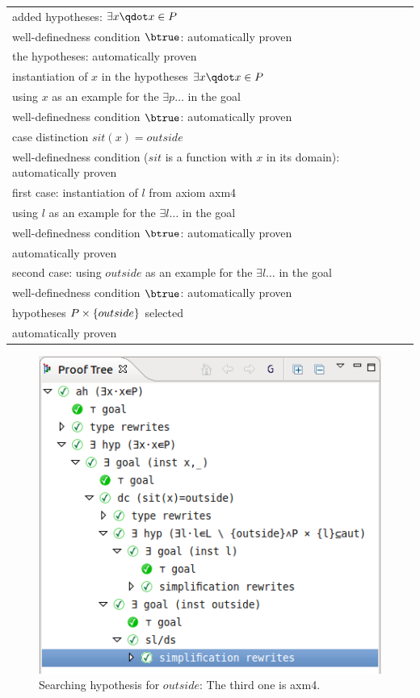 \begin{tabular}{l}
  \hline
  added hypotheses: $\exists x\qdot x\in P$ \\
  \quad well-definedness condition $\btrue$: automatically proven\\
  \quad the hypotheses: automatically proven \\
  \quad instantiation of $x$ in the hypotheses $\exists x\qdot x\in P$\\
  \qquad using $x$ as an example for the $\exists p \ldots$ in the goal\\
  \quad\qquad well-definedness condition $\btrue$: automatically proven\\
  \quad\qquad case distinction $sit(x)=outside$ \\
  \qquad\qquad well-definedness condition
    ($sit$ is a function with $x$ in its domain): automatically proven\\
  \qquad\qquad first case: instantiation of $l$ from axiom \textsf{axm4}\\
  \quad\qquad\qquad using $l$ as an example for the $\exists l \ldots$ in the goal\\
  \qquad\qquad\qquad well-definedness condition $\btrue$: automatically proven\\
  \qquad\qquad\qquad automatically proven\\
  \qquad\qquad second case: using $outside$ as an example for the $\exists l \ldots$ in the goal\\
  \quad\qquad\qquad well-definedness condition $\btrue$: automatically proven\\
  \quad\qquad\qquad hypotheses $P\mathbin\times\{outside\}$ selected\\
  \qquad\qquad\qquad automatically proven\\
  \hline
\end{tabular}
\begin{figure}[!ht]
  \begin{center}
    \includegraphics{img/tutorial/tut_10_proof_tree_final.png}
    \caption{Searching hypothesis for $outside$: The third one is \textsf{axm4}.}
    \label{fig_tut_10_final_proof_tree}
  \end{center}
\end{figure}



